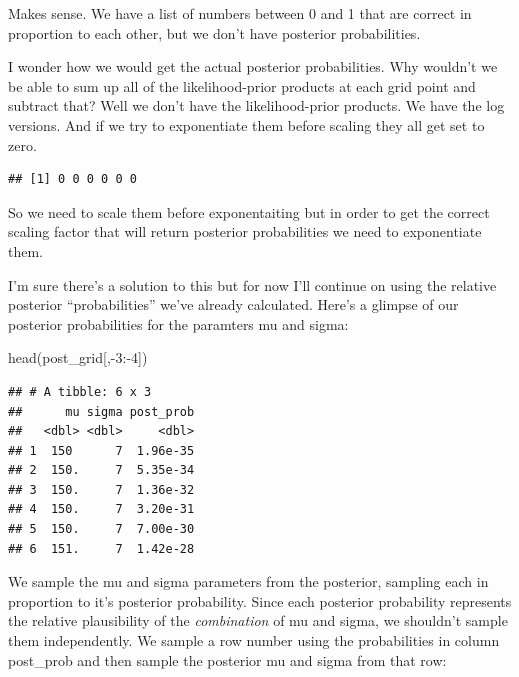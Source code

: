\documentclass[
]{book}
\newenvironment{Shaded}{\begin{snugshade}}{\end{snugshade}}
\newcommand{\DecValTok}[1]{\textcolor[rgb]{0.00,0.00,0.81}{#1}}
\newcommand{\FunctionTok}[1]{\textcolor[rgb]{0.00,0.00,0.00}{#1}}
\newcommand{\NormalTok}[1]{#1}
\newcommand{\SpecialCharTok}[1]{\textcolor[rgb]{0.00,0.00,0.00}{#1}}
\begin{document}
Makes sense. We have a list of numbers between 0 and 1 that are correct in proportion to each other, but we don't have posterior probabilities.

I wonder how we would get the actual posterior probabilities. Why wouldn't we be able to sum up all of the likelihood-prior products at each grid point and subtract that? Well we don't have the likelihood-prior products. We have the log versions. And if we try to exponentiate them before scaling they all get set to zero.

\begin{Shaded}
\end{Shaded}

\begin{verbatim}
## [1] 0 0 0 0 0 0
\end{verbatim}

So we need to scale them before exponentaiting but in order to get the correct scaling factor that will return posterior probabilities we need to exponentiate them.

I'm sure there's a solution to this but for now I'll continue on using the relative posterior ``probabilities'' we've already calculated. Here's a glimpse of our posterior probabilities for the paramters mu and sigma:

\begin{Shaded}
\begin{Highlighting}[]
\FunctionTok{head}\NormalTok{(post\_grid[,}\SpecialCharTok{{-}}\DecValTok{3}\SpecialCharTok{:{-}}\DecValTok{4}\NormalTok{])}
\end{Highlighting}
\end{Shaded}

\begin{verbatim}
## # A tibble: 6 x 3
##      mu sigma post_prob
##   <dbl> <dbl>     <dbl>
## 1  150      7  1.96e-35
## 2  150.     7  5.35e-34
## 3  150.     7  1.36e-32
## 4  150.     7  3.20e-31
## 5  150.     7  7.00e-30
## 6  151.     7  1.42e-28
\end{verbatim}

We sample the mu and sigma parameters from the posterior, sampling each in proportion to it's posterior probability. Since each posterior probability represents the relative plausibility of the \emph{combination} of mu and sigma, we shouldn't sample them independently. We sample a row number using the probabilities in column post\_prob and then sample the posterior mu and sigma from that row:
\end{document}
